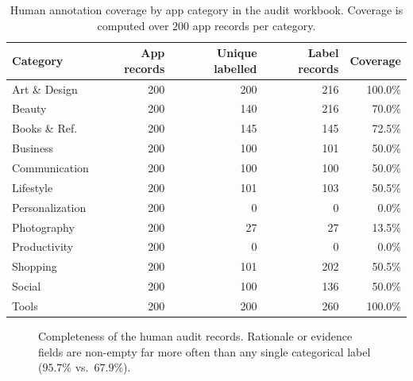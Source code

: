 \documentclass[11pt,a4paper]{article}
\begin{document}
\begin{table}[t]
\centering\small
\caption{Human annotation coverage by app category in the audit workbook.
Coverage is computed over $200$ app records per category.}
\label{tab:coverage}
\begin{tabular}{lrrrr}
\toprule
Category & App records & Unique labelled & Label records & Coverage \\
\midrule
Art \& Design     & 200 & 200 & 216 & 100.0\% \\
Beauty            & 200 & 140 & 216 & 70.0\% \\
Books \& Ref.     & 200 & 145 & 145 & 72.5\% \\
Business          & 200 & 100 & 101 & 50.0\% \\
Communication     & 200 & 100 & 100 & 50.0\% \\
Lifestyle         & 200 & 101 & 103 & 50.5\% \\
Personalization   & 200 & 0   & 0   & 0.0\%  \\
Photography       & 200 & 27  & 27  & 13.5\% \\
Productivity      & 200 & 0   & 0   & 0.0\%  \\
Shopping          & 200 & 101 & 202 & 50.5\% \\
Social            & 200 & 100 & 136 & 50.0\% \\
Tools             & 200 & 200 & 260 & 100.0\% \\
\bottomrule
\end{tabular}
\end{table}

\begin{figure}[t]
\centering
{}
\caption{Completeness of the human audit records. Rationale or evidence
fields are non-empty far more often than any single categorical label
($95.7\%$ vs.\ $67.9\%$).}
\label{fig:completeness}
\end{figure}
\end{document}
